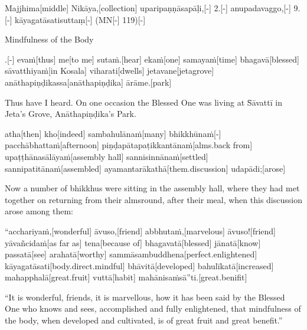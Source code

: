 
\begin{samepage}
\begingl[glneveryline={\PaliGlossA,\PaliGlossB}]
Majjhima[middle] Nikāya,[collection] uparipaṇṇāsapāḷi,[-] 2.[-] anupadavaggo,[-] 9.[-] kāyagatāsatisuttaṃ[-] (MN[-] 119)[-]
\endgl
\nopagebreak
\linespread{0.5}
\begin{spacin}{0.2}
{\PaliGlossFT Mindfulness of the Body}
\end{spacin}
\vskip 12pt
\end{samepage}
\vskip 0.2in
\begin{samepage}
.[-] evaṁ[thus] me[to me] sutaṁ.[hear] ekaṁ[one] samayaṁ[time] bhagavā[blessed] sāvatthiyaṁ[in Kosala] viharati[dwells] jetavane[jetagrove] anāthapiṇḍikassa[anāthapiṇḍika] ārāme.[park]
\endgl
\nopagebreak
\linespread{0.5}
\begin{spacin}{0.2}
{\PaliGlossFT Thus have I heard. On one occasion the Blessed One was living at S̄āvattī in Jeta’s Grove, Anāthapiṇḍika’s Park.}
\end{spacin}
\vskip 12pt
\end{samepage}
\begin{samepage}
\begingl[glneveryline={\PaliGlossA,\PaliGlossB}]
atha[then] kho[indeed] sambahulānaṁ[many] bhikkhūnaṁ[-] pacchābhattaṁ[afternoon] piṇḍapātapaṭikkantānaṁ[alms.back from] upaṭṭhānasālāyaṁ[assembly hall] sannisinnānaṁ[settled] sannipatitānaṁ[assembled] ayamantarākathā[them.discussion] udapādi;[arose]
\endgl
\nopagebreak
\linespread{0.5}
\begin{spacin}{0.2}
{\PaliGlossFT Now a number of bhikkhus were sitting in the assembly hall, where they had met together on returning from their almsround, after their meal, when this discussion arose among them:}
\end{spacin}
\vskip 12pt
\end{samepage}
\begin{samepage}
\begingl[glneveryline={\PaliGlossA,\PaliGlossB}]
“acchariyaṁ,[wonderful] āvuso,[friend] abbhutaṁ,[marvelous] āvuso![friend] yāvañcidaṁ[as far as] tena[because of] bhagavatā[blessed] jānatā[know] passatā[see] arahatā[worthy] sammāsambuddhena[perfect.enlightened] kāyagatāsati[body.direct.mindful] bhāvitā[developed] bahulīkatā[increased] mahapphalā[great.fruit] vuttā[habit] mahānisaṁsā”ti.[great.benifit]
\endgl
\nopagebreak
\linespread{0.5}
\begin{spacin}{0.2}
{\PaliGlossFT “It is wonderful, friends, it is marvellous, how it has been said by the Blessed One who knows and sees, accomplished and fully enlightened, that mindfulness of the body, when developed and cultivated, is of great fruit and great benefit.”}
\end{spacin}
\vskip 12pt
\end{samepage}
